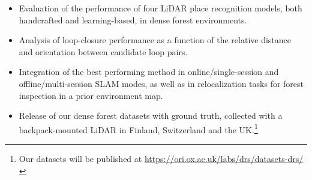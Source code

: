 \begin{itemize}
\setlength{\itemsep}{0pt}

\item Evaluation of the performance of four LiDAR place recognition models, both handcrafted and learning-based, in dense forest environments.

\item Analysis of loop-closure performance as a function of the relative distance and orientation between candidate loop pairs.

\item Integration of the best performing method in online/single-session and offline/multi-session SLAM modes, as well as in relocalization tasks for forest inspection in a prior environment map. 

\item Release of our dense forest datasets with ground truth, collected with a backpack-mounted LiDAR in Finland, Switzerland and the UK.\footnote{Our datasets will be published at \url{https://ori.ox.ac.uk/labs/drs/datasets-drs/}} 
\end{itemize}









